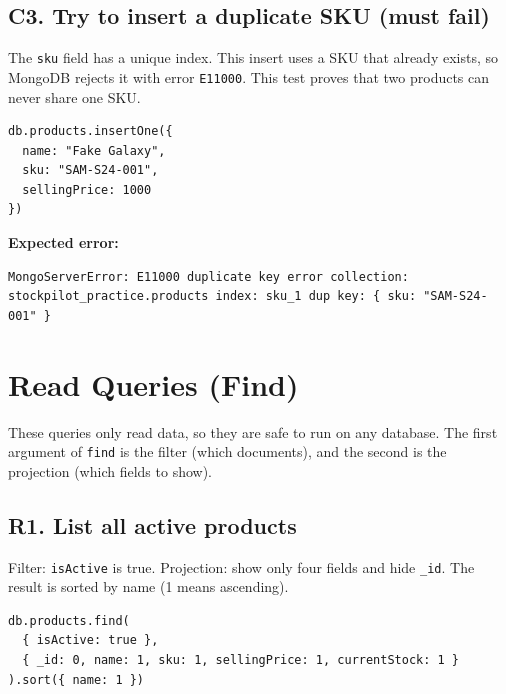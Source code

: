 \documentclass[11pt,a4paper]{article}
\newcommand{\code}[1]{\texttt{#1}}
\begin{document}
\subsection*{C3. Try to insert a duplicate SKU (must fail)}
The \code{sku} field has a unique index. This insert uses a SKU that already exists, so MongoDB rejects it with error \code{E11000}. This test proves that two products can never share one SKU.

\begin{minipage}{\linewidth}
\begin{lstlisting}[style=query]
db.products.insertOne({
  name: "Fake Galaxy",
  sku: "SAM-S24-001",
  sellingPrice: 1000
})
\end{lstlisting}
\end{minipage}

\noindent\textbf{Expected error:}
\begin{lstlisting}[style=result]
MongoServerError: E11000 duplicate key error collection: stockpilot_practice.products index: sku_1 dup key: { sku: "SAM-S24-001" }
\end{lstlisting}

\section{Read Queries (Find)}
These queries only read data, so they are safe to run on any database. The first argument of \code{find} is the filter (which documents), and the second is the projection (which fields to show).

\subsection*{R1. List all active products}
Filter: \code{isActive} is true. Projection: show only four fields and hide \code{\_id}. The result is sorted by name (1 means ascending).

\begin{minipage}{\linewidth}
\begin{lstlisting}[style=query]
db.products.find(
  { isActive: true },
  { _id: 0, name: 1, sku: 1, sellingPrice: 1, currentStock: 1 }
).sort({ name: 1 })
\end{lstlisting}
\end{minipage}
\end{document}
